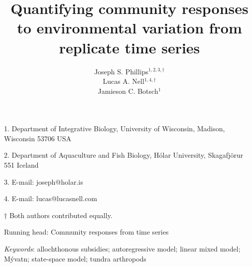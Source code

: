 \documentclass[12pt]{article}
\title{Quantifying community responses to environmental variation from replicate
time series}
\author{
Joseph S. Phillips$^{1,2,3,\dagger}$ \\
Lucas A. Nell$^{1,4,\dagger}$ \\
Jamieson C. Botsch$^{1}$}
\date{}
\begin{document}
\raggedright
\setlength\parindent{0.25in}

\maketitle


\noindent{} 1. Department of Integrative Biology, University of Wisconsin, Madison, Wisconsin 53706 USA

\noindent{} 2. Department of Aquaculture and Fish Biology, H\'{o}lar University, Skagafj\"{o}r{\dh}ur 551 Iceland

\noindent{} 3. E-mail: joseph@holar.is

\noindent{} 4. E-mail: lucas@lucasnell.com

\noindent{} $\dagger$ Both authors contributed equally.



\bigskip

Running head: {Community responses from time series}


\linenumbers{}

\clearpage




\bigskip

\textit{Keywords}: {allochthonous subsidies; autoregressive model; linear mixed model;
M\'{y}vatn; state-space model; tundra arthropods
}







\end{document}
